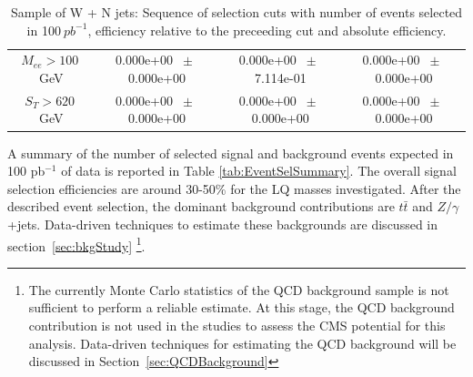 \begin{table}[htbp]
\begin{center}
\begin{tabular}{|c|c|c|c|}
          $M_{ee}>100~$GeV          &           0.000e+00          $~\pm~$          0.000e+00           &           0.000e+00          $~\pm~$          7.114e-01           &           0.000e+00
         $~\pm~$          0.000e+00          \\
          $ S_T>620~$GeV           &           0.000e+00          $~\pm~$          0.000e+00           &           0.000e+00          $~\pm~$          0.000e+00           &           0.000e+00
        $~\pm~$          0.000e+00          \\
          \hline\hline
\end{tabular}
\end{center}
\caption{Sample of W + N jets: Sequence of selection cuts with number of events selected in 100$~pb^{-1}$, efficiency relative to the preceeding cut and absolute efficiency.}
\label{tab:effic-W}
\end{table}



A summary of the number of selected signal and background events expected in 100 pb$^{-1}$ of data 
is reported in Table \ref{tab:EventSelSummary}. 
The overall signal selection efficiencies are around 30-50\% for the LQ masses investigated. 
After the described event selection, the dominant background contributions 
are $t\bar{t}$ and $Z/\gamma$+jets. Data-driven techniques to estimate these backgrounds
are discussed in section~\ref{sec:bkgStudy} \footnote{The currently Monte Carlo statistics of the QCD background sample
is not sufficient to perform a reliable estimate. At this stage, the QCD background contribution is not used in the studies
to assess the CMS potential for this analysis. Data-driven techniques for estimating the QCD background will be discussed in 
Section~\ref{sec:QCDBackground}}.

